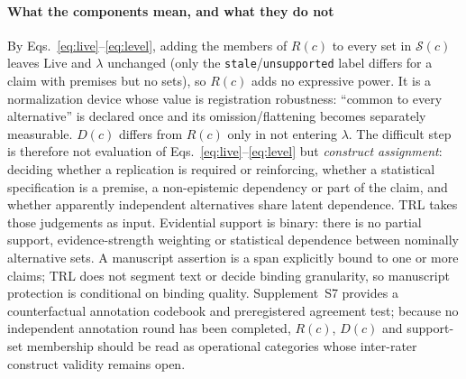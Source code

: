 \documentclass[journal]{IEEEtran}
\begin{document}
\paragraph{What the components mean, and what they do not}
By Eqs.~\eqref{eq:live}--\eqref{eq:level}, adding the members of $R(c)$ to every set in $\mathcal{S}(c)$ leaves $\mathrm{Live}$ and $\lambda$ unchanged (only the \texttt{stale}/\texttt{unsupported} label differs for a claim with premises but no sets), so $R(c)$ adds no expressive power. It is a normalization device whose value is registration robustness: ``common to every alternative'' is declared once and its omission/flattening becomes separately measurable. $D(c)$ differs from $R(c)$ only in not entering $\lambda$. The difficult step is therefore not evaluation of Eqs.~\eqref{eq:live}--\eqref{eq:level} but \emph{construct assignment}: deciding whether a replication is required or reinforcing, whether a statistical specification is a premise, a non-epistemic dependency or part of the claim, and whether apparently independent alternatives share latent dependence. TRL takes those judgements as input. Evidential support is binary: there is no partial support, evidence-strength weighting or statistical dependence between nominally alternative sets. A manuscript assertion is a span explicitly bound to one or more claims; TRL does not segment text or decide binding granularity, so manuscript protection is conditional on binding quality. Supplement~S7 provides a counterfactual annotation codebook and preregistered agreement test; because no independent annotation round has been completed, $R(c)$, $D(c)$ and support-set membership should be read as operational categories whose inter-rater construct validity remains open.
\end{document}
